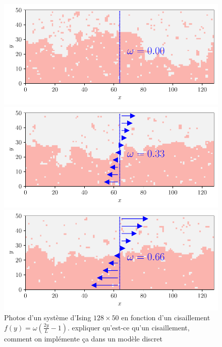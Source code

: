 \begin{figure}
	\begin{minipage}[t]{0.5\linewidth}
		\includegraphics[width=\linewidth]{intro/cis-ising-f-000.pdf}
	\end{minipage}%
	\begin{minipage}[t]{0.5\linewidth}
		\includegraphics[width=\linewidth]{intro/cis-ising-f-033.pdf}
	\end{minipage}
	\centering
	\begin{minipage}[t]{0.5\linewidth}
		\includegraphics[width=\linewidth]{intro/cis-ising-f-066.pdf}
	\end{minipage}
	\caption{Photos d'un système d'Ising $128 \times 50$ en fonction d'un cisaillement
	${f(y) = \omega (\frac{2 y}{L} -1)}$.  {\color{red} expliquer qu'est-ce qu'un cisaillement, comment on implémente ça dans un modèle discret}}
    \label{snap-ising-shear}	
\end{figure}  


